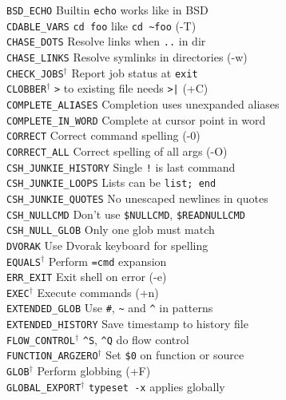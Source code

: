 \documentclass{article}
\newcommand\T[1]{\texttt{#1}}
\newcommand\D{$^\dag$}
\begin{document}
\begin{multicols}{3}
\begin{tabbing}
\T{BSD\_ECHO}            \>\> Builtin \T{echo} works like in BSD \\
\T{CDABLE\_VARS}         \>\> \T{cd foo} like \verb!cd ~foo! (-T) \\
\T{CHASE\_DOTS}          \>\> Resolve links when \verb!..! in dir \\
\T{CHASE\_LINKS}         \>\> Resolve symlinks in directories (-w) \\
\T{CHECK\_JOBS}\D        \>\> Report job status at \T{exit} \\
\T{CLOBBER}\D            \>\> \verb!>! to existing file needs \verb!>|! (+C) \\
\T{COMPLETE\_ALIASES}    \>\> Completion uses unexpanded aliases \\
\T{COMPLETE\_IN\_WORD}   \>\> Complete at cursor point in word \\
\T{CORRECT}              \>\> Correct command spelling (-0) \\
\T{CORRECT\_ALL}         \>\> Correct spelling of all args (-O) \\
\T{CSH\_JUNKIE\_HISTORY} \>\> Single \verb.!. is last command \\
\T{CSH\_JUNKIE\_LOOPS}   \>\> Lists can be \verb!list; end! \\
\T{CSH\_JUNKIE\_QUOTES}  \>\> No unescaped newlines in quotes \\
\T{CSH\_NULLCMD}         \>\> Don't use \verb!$NULLCMD!, \verb!$READNULLCMD! \\
\T{CSH\_NULL\_GLOB}      \>\> Only one glob must match \\
\T{DVORAK}               \>\> Use Dvorak keyboard for spelling \\
\T{EQUALS}\D             \>\> Perform \verb!=cmd! expansion \\
\T{ERR\_EXIT}            \>\> Exit shell on error (-e) \\
\T{EXEC}\D               \>\> Execute commands (+n) \\
\T{EXTENDED\_GLOB}       \>\> Use \verb!#!, \verb!~! and \verb!^! in
   patterns \\
\T{EXTENDED\_HISTORY}    \>\> Save timestamp to history file \\
\T{FLOW\_CONTROL}\D      \>\> \verb!^S!, \verb!^Q! do flow control \\
\T{FUNCTION\_ARGZERO}\D  \>\> Set \verb!$0! on function or source \\
\T{GLOB}\D               \>\> Perform globbing (+F) \\
\T{GLOBAL\_EXPORT}\D      \>\> \verb!typeset -x! applies globally \\

\end{tabbing}
\end{multicols}
\end{document}
